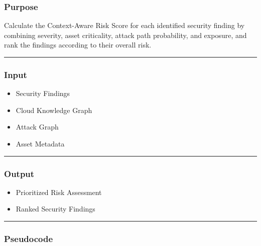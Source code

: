 \subsubsection{\texorpdfstring{\textbf{Purpose}}{Purpose}}

Calculate the Context-Aware Risk Score for each identified security finding by combining severity, asset criticality, attack path probability, and exposure, and rank the findings according to their overall risk.

\begin{center}\rule{0.5\linewidth}{0.5pt}\end{center}

\subsubsection{\texorpdfstring{\textbf{Input}}{Input}}

\begin{itemize}
\tightlist
\item
  Security Findings\\
\item
  Cloud Knowledge Graph\\
\item
  Attack Graph\\
\item
  Asset Metadata
\end{itemize}

\begin{center}\rule{0.5\linewidth}{0.5pt}\end{center}

\subsubsection{\texorpdfstring{\textbf{Output}}{Output}}

\begin{itemize}
\tightlist
\item
  Prioritized Risk Assessment\\
\item
  Ranked Security Findings
\end{itemize}

\begin{center}\rule{0.5\linewidth}{0.5pt}\end{center}

\subsubsection{Pseudocode}

